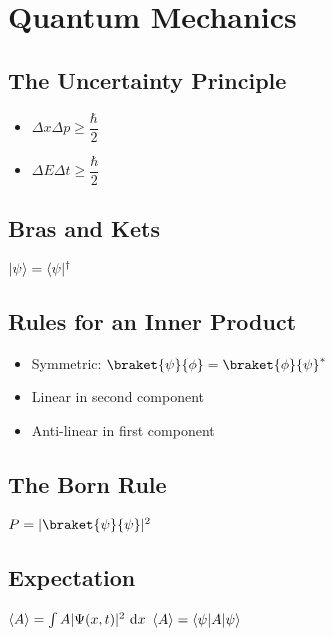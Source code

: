 	\section{Quantum Mechanics}	

\subsection{The Uncertainty Principle}
\begin{itemize}
\item \( \Delta x \Delta p \geq \dfrac{\hbar}{2} \)
\item \( \Delta E \Delta t \geq \dfrac{\hbar}{2} \)
\end{itemize}

\subsection{Bras and Kets}			
\begin{itemize}
\itemt \( \lvert\psi\rangle = \langle\psi\rvert^\dagger \)
\end{itemize}				

\subsection{Rules for an Inner Product}			

\begin{itemize}
\itemt \( \braket{\psi}{\phi} \equiv (\ket{\psi}, \ket{\phi}) \)
\item Symmetric:
\subitem \( \braket{\psi}{\phi} = \braket{\phi}{\psi}^* \)
\item Linear in second component
\item Anti-linear in first component
\end{itemize}				

\subsection{The Born Rule}
\begin{itemize}
\itemt \( P = |\braket{\psi}{\psi}|^2 \)
\end{itemize}

\subsection{Expectation}
\begin{itemize}
\itemt \( \langle A \rangle = \int A |\Psi(x,t)|^2 \ \mathrm{d}x \)
\itemt \( \langle A \rangle = \langle\psi\rvert A \lvert\psi\rangle \)
\end{itemize}	

